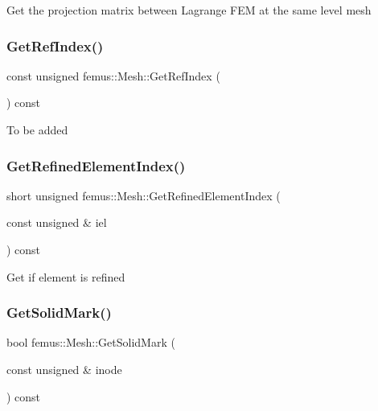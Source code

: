 Get the projection matrix between Lagrange F\+EM at the same level mesh \mbox{\label{classfemus_1_1_mesh_a488d6e2380e12d1c77e3bc88bb5b5810}} 
\subsubsection{\texorpdfstring{Get\+Ref\+Index()}{GetRefIndex()}}
{\footnotesize\ttfamily const unsigned femus\+::\+Mesh\+::\+Get\+Ref\+Index (\begin{DoxyParamCaption}{ }\end{DoxyParamCaption}) const\hspace{0.3cm}{\ttfamily [inline]}}

To be added \mbox{\label{classfemus_1_1_mesh_a4bb06da5142bf2843a87a6dccca78c3c}} 
\subsubsection{\texorpdfstring{Get\+Refined\+Element\+Index()}{GetRefinedElementIndex()}}
{\footnotesize\ttfamily short unsigned femus\+::\+Mesh\+::\+Get\+Refined\+Element\+Index (\begin{DoxyParamCaption}\item[{const unsigned \&}]{iel }\end{DoxyParamCaption}) const}

Get if element is refined \mbox{\label{classfemus_1_1_mesh_ac33a64e1476d69bb9bf7f025f6fc0f7b}} 
\subsubsection{\texorpdfstring{Get\+Solid\+Mark()}{GetSolidMark()}}
{\footnotesize\ttfamily bool femus\+::\+Mesh\+::\+Get\+Solid\+Mark (\begin{DoxyParamCaption}\item[{const unsigned \&}]{inode }\end{DoxyParamCaption}) const}

